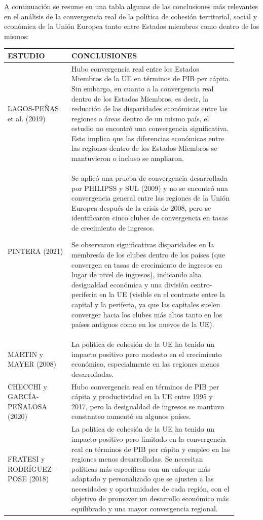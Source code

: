 \documentclass[10pt,a4paper]{article}
\begin{document}
A continuación se resume en una tabla algunas de las conclusiones más relevantes en el análisis de la convergencia real de la política de cohesión territorial, social y económica de la Unión Europea tanto entre Estados miembros como dentro de los mismos:

\begin{center}
\begin{tabular}{|p{0.25\linewidth}|p{0.65\linewidth}|}
\hline
\textbf{ESTUDIO} & \textbf{CONCLUSIONES} \\
\hline
LAGOS-PEÑAS et al. (2019) & Hubo convergencia real entre los Estados Miembros de la UE en términos de PIB per cápita. Sin embargo, en cuanto a la convergencia real dentro de los Estados Miembros, es decir, la reducción de las disparidades económicas entre las regiones o áreas dentro de un mismo país, el estudio no encontró una convergencia significativa. Esto implica que las diferencias económicas entre las regiones dentro de los Estados Miembros se mantuvieron o incluso se ampliaron. \\
PINTERA (2021) & Se aplicó una prueba de convergencia desarrollada por PHILIPSS y SUL (2009) y no se encontró una convergencia general entre las regiones de la Unión Europea después de la crisis de 2008, pero se identificaron cinco clubes de convergencia en tasas de crecimiento de ingresos. \par Se observaron significativas disparidades en la membresía de los clubes dentro de los países (que convergen en tasas de crecimiento de ingresos en lugar de nivel de ingresos), indicando alta desigualdad económica y una división centro-periferia en la UE (visible en el contraste entre la capital y la periferia, ya que las capitales suelen converger hacia los clubes más altos tanto en los países antiguos como en los nuevos de la UE). \\
\hline
MARTIN y MAYER (2008) & La política de cohesión de la UE ha tenido un impacto positivo pero modesto en el crecimiento económico, especialmente en las regiones menos desarrolladas. \\
\hline
CHECCHI y GARCÍA-PEÑALOSA (2020) & Hubo convergencia real en términos de PIB per cápita y productividad en la UE entre 1995 y 2017, pero la desigualdad de ingresos se mantuvo constanteo aumentó en algunos países. \\
\hline
FRATESI y RODRÍGUEZ-POSE (2018) & La política de cohesión de la UE ha tenido un impacto positivo pero limitado en la convergencia real en términos de PIB per cápita y empleo en las regiones menos desarrolladas. Se necesitan políticas más específicas con un enfoque más adaptado y personalizado que se ajusten a las necesidades y oportunidades de cada región, con el objetivo de promover un desarrollo económico más equilibrado y una mayor convergencia regional.\\

\end{tabular}
\end{center}
\end{document}
